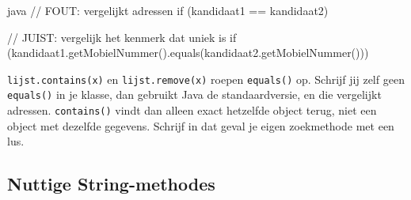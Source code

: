 \documentclass[a4paper,11pt]{article}
\begin{document}
\begin{codeblock}{java}
    // FOUT: vergelijkt adressen
    if (kandidaat1 == kandidaat2) { }

    // JUIST: vergelijk het kenmerk dat uniek is
    if (kandidaat1.getMobielNummer().equals(kandidaat2.getMobielNummer())) { }
\end{codeblock}

\texttt{lijst.contains(x)} en \texttt{lijst.remove(x)} roepen \texttt{equals()}
op. Schrijf jij zelf geen \texttt{equals()} in je klasse, dan gebruikt Java de
standaardversie, en die vergelijkt adressen. \texttt{contains()} vindt dan alleen
exact hetzelfde object terug, niet een object met dezelfde gegevens. Schrijf in
dat geval je eigen zoekmethode met een lus.

\subsection{Nuttige String-methodes}
\end{document}
